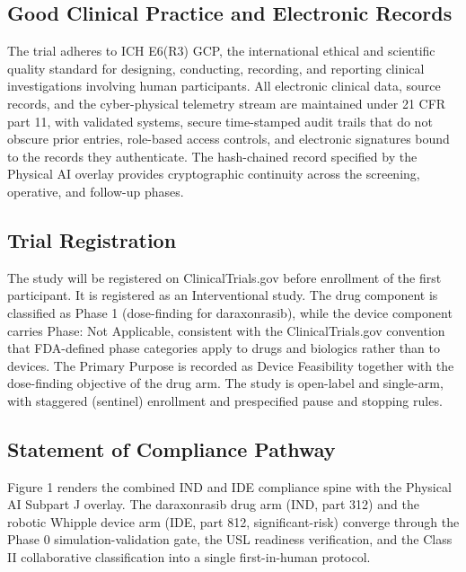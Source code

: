 \subsection{Good Clinical Practice and Electronic Records}

The trial adheres to ICH E6(R3) GCP, the international ethical and scientific
quality standard for designing, conducting, recording, and reporting clinical
investigations involving human participants. All electronic clinical data,
source records, and the cyber-physical telemetry stream are maintained under 21
CFR part 11, with validated systems, secure time-stamped audit trails that do not
obscure prior entries, role-based access controls, and electronic signatures
bound to the records they authenticate. The hash-chained record specified by the
Physical AI overlay provides cryptographic continuity across the screening,
operative, and follow-up phases.

\subsection{Trial Registration}

The study will be registered on ClinicalTrials.gov before enrollment of the
first participant. It is registered as an Interventional study. The drug
component is classified as Phase 1 (dose-finding for daraxonrasib), while the
device component carries Phase: Not Applicable, consistent with the
ClinicalTrials.gov convention that FDA-defined phase categories apply to drugs
and biologics rather than to devices. The Primary Purpose is recorded as Device
Feasibility together with the dose-finding objective of the drug arm. The study
is open-label and single-arm, with staggered (sentinel) enrollment and
prespecified pause and stopping rules.

\subsection{Statement of Compliance Pathway}

Figure 1 renders the combined IND and IDE compliance spine with the Physical AI
Subpart J overlay. The daraxonrasib drug arm (IND, part 312) and the robotic
Whipple device arm (IDE, part 812, significant-risk) converge through the
Phase 0 simulation-validation gate, the USL readiness verification, and the
Class II collaborative classification into a single first-in-human protocol.

